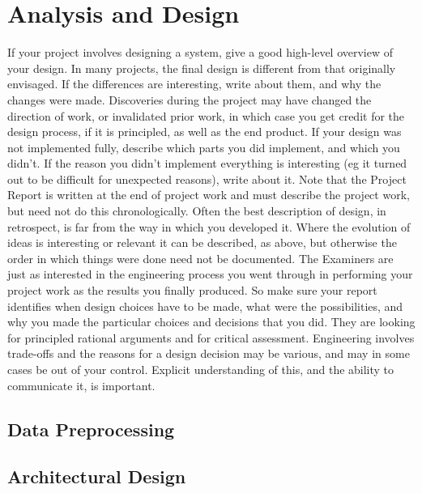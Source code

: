 \documentclass[10pt,onecolumn,letterpaper]{article}
\begin{document}
\iffalse

\section{Analysis and Design}

If your project involves designing a system, give a
good high-level overview of your design.
In many projects, the final design is different from
that originally envisaged. If the differences are
interesting, write about them, and why the changes
were made. Discoveries during the project may have
changed the direction of work, or invalidated prior
work, in which case you get credit for the design
process, if it is principled, as well as the end product.
If your design was not implemented fully, describe
which parts you did implement, and which you didn't.
If the reason you didn't implement everything is
interesting (eg it turned out to be difficult for
unexpected reasons), write about it.
Note that the Project Report is written at the end of
project work and must describe the project work, but
need not do this chronologically. Often the best
description of design, in retrospect, is far from the
way in which you developed it. Where the evolution
of ideas is interesting or relevant it can be described,
as above, but otherwise the order in which things
were done need not be documented.
The Examiners are just as interested in the
engineering process you went through in performing
your project work as the results you finally produced.
So make sure your report identifies when design
choices have to be made, what were the possibilities,
and why you made the particular choices and
decisions that you did. They are looking for principled
rational arguments and for critical assessment.
Engineering involves trade-offs and the reasons for a
design decision may be various, and may in some
cases be out of your control. Explicit understanding of
this, and the ability to communicate it, is important.

\subsection{Data Preprocessing}

\subsection{Architectural Design} 
\end{document}
